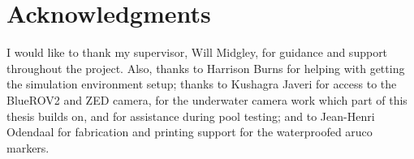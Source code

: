 \section*{Acknowledgments}


I would like to thank my supervisor, Will Midgley, for guidance and support throughout the project. Also, thanks to Harrison Burns for helping with getting the simulation environment setup; thanks to Kushagra Javeri for access to the BlueROV2 and ZED camera, for the underwater camera work which part of this thesis builds on, and for assistance during pool testing; and to Jean-Henri Odendaal for fabrication and printing support for the waterproofed aruco markers.